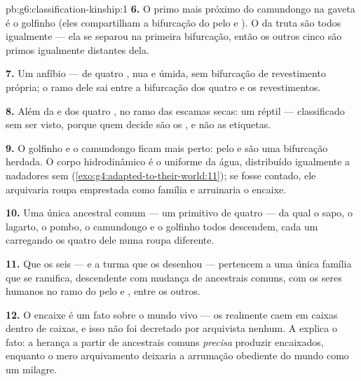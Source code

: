 \begin{solution}{pb:g6:classification-kinship:1}
\textbf{6.} O primo mais próximo do camundongo na gaveta é o golfinho
(eles compartilham a bifurcação do pelo e ). O da truta são todos
igualmente --- ela se separou na primeira bifurcação, então os outros
cinco são primos igualmente distantes dela.

\textbf{7.} Um anfíbio --- de quatro ,  nua e úmida, sem
bifurcação de revestimento própria; o ramo dele sai entre a bifurcação
dos quatro  e os revestimentos.

\textbf{8.} Além da  e dos quatro , no ramo das
escamas secas: um réptil --- classificado sem ser visto, porque quem
decide são os , e não as etiquetas.

\textbf{9.} O golfinho e o camundongo ficam mais perto: pelo e 
são uma bifurcação herdada. O corpo hidrodinâmico é o uniforme da
água, distribuído igualmente a nadadores sem 
(\cref{exo:g4:adapted-to-their-world:11}); se fosse contado, ele
arquivaria roupa emprestada como família e arruinaria o encaixe.

\textbf{10.} Uma única  ancestral comum --- um 
primitivo de quatro  --- da qual o sapo, o lagarto, o pombo, o
camundongo e o golfinho todos descendem, cada um carregando os quatro
 dele numa roupa diferente.

\textbf{11.} Que os seis --- e a turma que os desenhou --- pertencem a
uma única família que se ramifica, descendente com mudança de
ancestrais comuns, com os seres humanos no ramo do pelo e , entre
os outros.

\textbf{12.} O encaixe é um fato sobre o mundo vivo --- os 
realmente caem em caixas dentro de caixas, e isso não foi decretado
por arquivista nenhum. A  explica o fato: a herança a partir de
ancestrais comuns \emph{precisa} produzir  encaixados,
enquanto o mero arquivamento deixaria a arrumação obediente do mundo
como um milagre.
\end{solution}
